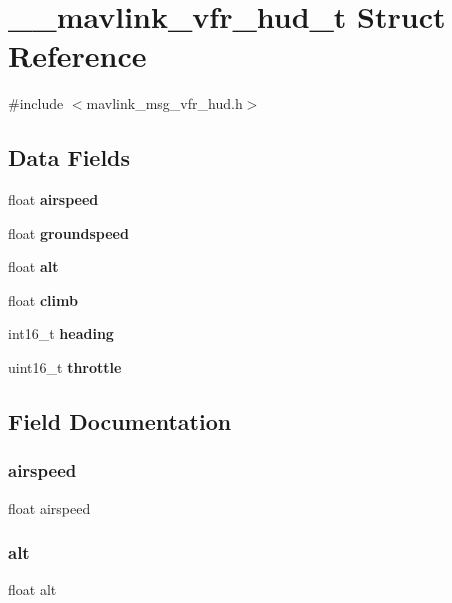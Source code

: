 \section{\+\_\+\+\_\+mavlink\+\_\+vfr\+\_\+hud\+\_\+t Struct Reference}
\label{struct____mavlink__vfr__hud__t}


{\ttfamily \#include $<$mavlink\+\_\+msg\+\_\+vfr\+\_\+hud.\+h$>$}

\subsection*{Data Fields}
\begin{DoxyCompactItemize}
\item 
float \textbf{ airspeed}
\item 
float \textbf{ groundspeed}
\item 
float \textbf{ alt}
\item 
float \textbf{ climb}
\item 
int16\+\_\+t \textbf{ heading}
\item 
uint16\+\_\+t \textbf{ throttle}
\end{DoxyCompactItemize}


\subsection{Field Documentation}
\mbox{\label{struct____mavlink__vfr__hud__t_a2a48553c0ca332797b83fc7147f15679}} 
\subsubsection{airspeed}
{\footnotesize\ttfamily float airspeed}

\mbox{\label{struct____mavlink__vfr__hud__t_adbf37c628254d78394e4533464a31a8a}} 
\subsubsection{alt}
{\footnotesize\ttfamily float alt}

